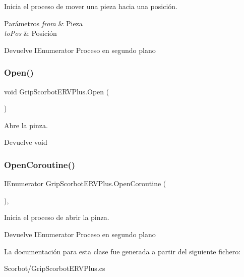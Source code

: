 Inicia el proceso de mover una pieza hacia una posición. 
\begin{DoxyParams}{Parámetros}
{\em from} & Pieza \\
\hline
{\em to\+Pos} & Posición \\
\hline
\end{DoxyParams}
\begin{DoxyReturn}{Devuelve}
I\+Enumerator Proceso en segundo plano 
\end{DoxyReturn}
\mbox{\label{class_grip_scorbot_e_r_v_plus_a5e70a5bedcd58c5ac70c616741294f71}} 
\subsubsection{\texorpdfstring{Open()}{Open()}}
{\footnotesize\ttfamily void Grip\+Scorbot\+E\+R\+V\+Plus.\+Open (\begin{DoxyParamCaption}{ }\end{DoxyParamCaption})\hspace{0.3cm}{\ttfamily [inline]}}

Abre la pinza. \begin{DoxyReturn}{Devuelve}
void 
\end{DoxyReturn}
\mbox{\label{class_grip_scorbot_e_r_v_plus_a80dc2479b382451c0a41893e64287382}} 
\subsubsection{\texorpdfstring{OpenCoroutine()}{OpenCoroutine()}}
{\footnotesize\ttfamily I\+Enumerator Grip\+Scorbot\+E\+R\+V\+Plus.\+Open\+Coroutine (\begin{DoxyParamCaption}{ }\end{DoxyParamCaption})\hspace{0.3cm}{\ttfamily [inline]}, {\ttfamily [private]}}

Inicia el proceso de abrir la pinza. \begin{DoxyReturn}{Devuelve}
I\+Enumerator Proceso en segundo plano 
\end{DoxyReturn}


La documentación para esta clase fue generada a partir del siguiente fichero\+:\begin{DoxyCompactItemize}
\item 
Scorbot/Grip\+Scorbot\+E\+R\+V\+Plus.\+cs\end{DoxyCompactItemize}
